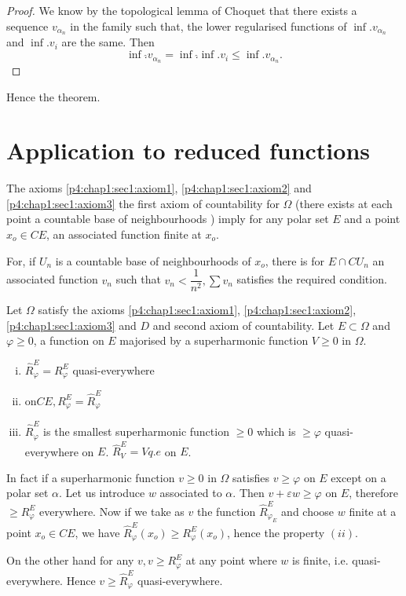 \begin{proof} %
  We know by the topological lemma of Choquet that there exists a
  sequence $v_{\alpha_n}$ in the family such that, the lower
  regularised functions of $\inf. v_{\alpha_n}$ and $\inf. v_i$ are the
  same. Then 
  $$
  \inf. \hat{} v_{\alpha_n} = \inf. \hat{ } \inf. v_i \le \inf. v_{\alpha_n}.
  $$
\end{proof}

\noindent
Hence the theorem.

\section{Application to reduced functions}\label{p4:chap8:sec37} %

\begin{remark*} %
  The axioms \ref{p4:chap1:sec1:axiom1},
\ref{p4:chap1:sec1:axiom2} and \ref{p4:chap1:sec1:axiom3} the first axiom of countability for
  $\Omega$ (there exists at each point a countable base of
  neighbourhoods ) imply for any polar set $E$ and a point $x_o \in
  CE$, an associated function finite at $x_o$. 
\end{remark*}

For, if $U_n$ is a countable base of neighbourhoods of $x_o$, there is
for $E \cap C U_n$ an associated function $v_n$ such that $v_n <
\dfrac{1}{n^2}, \sum v_n$ satisfies the required condition. 

\begin{prop}\label{p4:chap8:sec37:prop23} %
  Let $\Omega$ satisfy the axioms \ref{p4:chap1:sec1:axiom1},
  \ref{p4:chap1:sec1:axiom2}, \ref{p4:chap1:sec1:axiom3} and $D$ and second axiom
  of countability. Let $E \subset \Omega$ and $\varphi \ge 0$, a
  function on $E$ majorised by a superharmonic function $V \ge 0$  in
  $\Omega$. 
\end{prop}

\begin{enumerate} [(i)]
\item $\hat{R}^E_\varphi = R^E_\varphi$ quasi-everywhere
\item on\pageoriginale $CE, R^E_\varphi = \hat{R}^E_\varphi$
\item $\hat{R}^E_\varphi$ is the smallest superharmonic function $\ge
  0$ which is  $\ge \varphi$ quasi-everywhere on $E$. $\hat{R}^E_V = V
  q.e$ on $E$.  
\end{enumerate}

In fact if a superharmonic function $v \ge 0$ in $\Omega$ satisfies $v
\ge \varphi$ on $E$ except on a polar set $\alpha$. Let us introduce
$w$ associated to $\alpha$. Then $v + \varepsilon w \ge \varphi$ on
$E$, therefore $\ge R^E_\varphi$ everywhere. Now if we take as $v$ the
function $\hat{R}^E_{\varphi_E} $ and choose $w$ finite at a point
$x_o \in CE$, we have $\hat{R}^E_\varphi (x_o) \ge R^E_\varphi(x_o)$,
hence the property $(ii)$. 

On the other hand for any $v,  v \ge R^E_\varphi$ at any point where
$w$ is finite, i.e. quasi-everywhere. Hence $v \ge \hat{R}^E_\varphi$
quasi-everywhere. 
